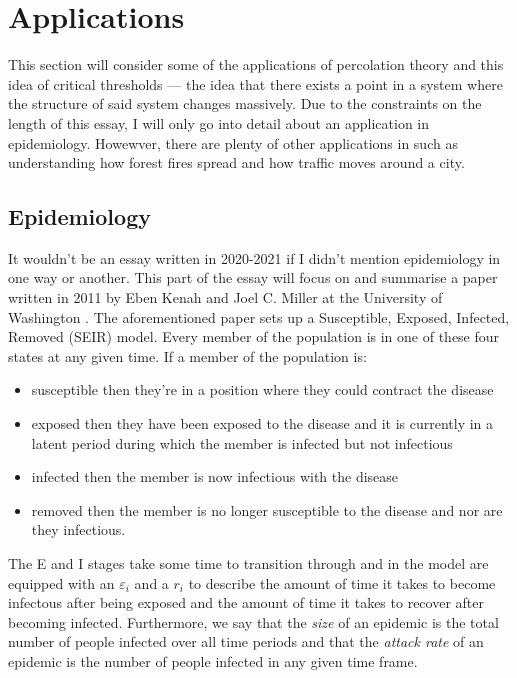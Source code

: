 \section{Applications}
This section will consider some of the applications of percolation theory and this idea of critical thresholds --- the idea that there exists a point in a system where the
structure of said system changes massively. Due to the constraints on the length of this essay, I will only go into detail about an application in epidemiology. Howewver, there
are plenty of other applications in such as understanding how forest fires spread \cite{Pak} and how traffic moves around a city. \cite{Li}

\subsection{Epidemiology}
It wouldn't be an essay written in 2020-2021 if I didn't mention epidemiology in one way or another. This part of the essay will focus on and summarise a paper written in 2011 by Eben Kenah and
Joel C. Miller at the University of Washington \cite{Kenah}. The aforementioned paper sets up a Susceptible, Exposed, Infected, Removed (SEIR) model. Every member of the population
is in one of these four states at any given time. If a member of the population is:

\begin{itemize}
  \item susceptible then they're in a position where they could contract the disease
  \item exposed then they have been exposed to the disease and it is currently in a latent period during which the member is infected but not infectious
  \item infected then the member is now infectious with the disease
  \item removed then the member is no longer susceptible to the disease and nor are they infectious.
\end{itemize}

The E and I stages take some time to transition through and in the model are equipped with an $\varepsilon_i$ and a $r_i$ to describe the amount of time it takes to become infectous
after being exposed and the amount of time it takes to recover after becoming infected. Furthermore, we say that the \textit{size} of an epidemic is the total number of people
infected over all time periods and that the \textit{attack rate} of an epidemic is the number of people infected in any given time frame.

